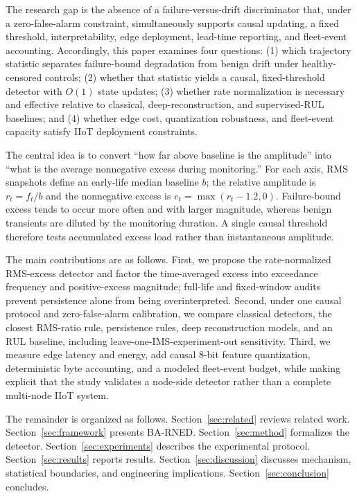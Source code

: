 \documentclass[journal]{IEEEtran}
\begin{document}
The research gap is the absence of a failure-versus-drift discriminator that, under a zero-false-alarm constraint, simultaneously supports causal updating, a fixed threshold, interpretability, edge deployment, lead-time reporting, and fleet-event accounting. Accordingly, this paper examines four questions: (1) which trajectory statistic separates failure-bound degradation from benign drift under healthy-censored controls; (2) whether that statistic yields a causal, fixed-threshold detector with $O(1)$ state updates; (3) whether rate normalization is necessary and effective relative to classical, deep-reconstruction, and supervised-RUL baselines; and (4) whether edge cost, quantization robustness, and fleet-event capacity satisfy IIoT deployment constraints.

The central idea is to convert ``how far above baseline is the amplitude'' into ``what is the average nonnegative excess during monitoring.'' For each axis, RMS snapshots define an early-life median baseline $b$; the relative amplitude is $r_t=f_t/b$ and the nonnegative excess is $e_t=\max(r_t-1.2,0)$. Failure-bound excess tends to occur more often and with larger magnitude, whereas benign transients are diluted by the monitoring duration. A single causal threshold therefore tests accumulated excess load rather than instantaneous amplitude.

The main contributions are as follows. First, we propose the rate-normalized RMS-excess detector and factor the time-averaged excess into exceedance frequency and positive-excess magnitude; full-life and fixed-window audits prevent persistence alone from being overinterpreted. Second, under one causal protocol and zero-false-alarm calibration, we compare classical detectors, the closest RMS-ratio rule, persistence rules, deep reconstruction models, and an RUL baseline, including leave-one-IMS-experiment-out sensitivity. Third, we measure edge latency and energy, add causal 8-bit feature quantization, deterministic byte accounting, and a modeled fleet-event budget, while making explicit that the study validates a node-side detector rather than a complete multi-node IIoT system.

The remainder is organized as follows. Section~\ref{sec:related} reviews related work. Section~\ref{sec:framework} presents BA-RNED. Section~\ref{sec:method} formalizes the detector. Section~\ref{sec:experiments} describes the experimental protocol. Section~\ref{sec:results} reports results. Section~\ref{sec:discussion} discusses mechanism, statistical boundaries, and engineering implications. Section~\ref{sec:conclusion} concludes.
\end{document}
